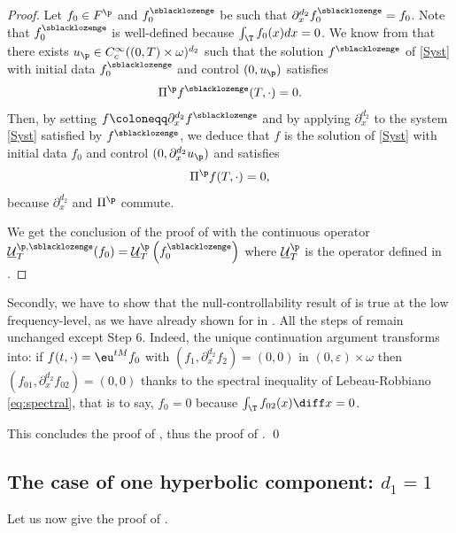 \begin{proof}
Let $f_0 \in F^{\p}$ and $f_0^{\sblacklozenge}$ be such that $\partial_{x}^{d_2}f_0^{\sblacklozenge} = f_0$. Note that $f_0^{\sblacklozenge}$ is well-defined because $\int_{\T} f_0(x) dx = 0$. We know from  that there exists $u_{\p} \in C^\infty_c((0,T)\times\omega)^{d_2}$ such that the solution $f^{\sblacklozenge}$ of \eqref{Syst} with initial data $f_0^{\sblacklozenge}$ and control $(0,u_{\p})$ satisfies
\[
\Pi^{\p} f^{\sblacklozenge}(T,\cdot)=0.
\]
Then, by setting $f\coloneqq \partial_{x}^{d_2} f^{\sblacklozenge}$ and by applying $\partial_{x}^{d_2}$ to the system \eqref{Syst} satisfied by $f^{\sblacklozenge}$, we deduce that $f$ is the solution of \eqref{Syst} with initial data $f_0$ and control $(0, \partial_x^{d_2}u_{\p})$ and satisfies
\[
\Pi^{\p} f(T,\cdot)=0,
\]
because $\partial_{x}^{d_2}$ and $\Pi^{\p}$ commute.

We get the conclusion of the proof of  with the continuous operator $\underline{\mathcal{U}}_T^{\p,\sblacklozenge}(f_0) = \underline{\mathcal{U}}_T^\p\left(f_0^{\sblacklozenge}\right)$ where $\underline{\mathcal{U}}_T^\p$ is the operator defined in .
\end{proof}

Secondly, we have to show that the null-controllability result of  is true at the low frequency-level, as we have already shown for  in . All the steps of  remain unchanged except Step $6$. Indeed, the unique continuation argument transforms into: if $f(t,\cdot) = \eu^{tM} f_0$ with $(f_1, \partial_{x}^{d_2} f_2) = (0,0)$ in $(0,\varepsilon)\times\omega$ then $(f_{01}, \partial_{x}^{d_2} f_{02})= (0,0)$ thanks to the spectral inequality of Lebeau-Robbiano \eqref{eq:spectral}, that is to say, $f_0 = 0$ because $\int_{\T} f_{02}(x) \diff x =0$.

This concludes the proof of , thus the proof of . \qed

\subsection{The case of one hyperbolic component: $d_1 = 1$}
\label{SectionControlHyperbolicd_1=1}
Let us now give the proof of .

